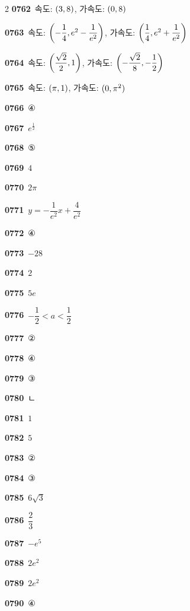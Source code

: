 \documentclass[10pt,a4paper]{article}
\begin{document}
\begin{multicols}{2}
\noindent\textbf{0762}\ 속도: $(3{,}\mkern3mu\mathopen{}8)$, 가속도: $(0{,}\mkern3mu\mathopen{}8)$\par
\noindent\textbf{0763}\ 속도: $\left(-\dfrac{1}{4}{,}\mkern3mu\mathopen{}e^2-\dfrac{1}{e^2}\right)$, 가속도: $\left(\dfrac{1}{4}{,}\mkern3mu\mathopen{}e^2+\dfrac{1}{e^2}\right)$\par
\noindent\textbf{0764}\ 속도: $\left(\dfrac{\sqrt{2}}{2}{,}\mkern3mu\mathopen{}1\right)$, 가속도: $\left(-\dfrac{\sqrt{2}}{8}{,}\mkern3mu\mathopen{}-\dfrac{1}{2}\right)$\par
\noindent\textbf{0765}\ 속도: $(\pi{,}\mkern3mu\mathopen{}1)$, 가속도: $(0{,}\mkern3mu\mathopen{}\pi^2)$\par
\noindent\textbf{0766}\ ④\par
\noindent\textbf{0767}\ $e^{\frac{1}{2}}$\par
\noindent\textbf{0768}\ ⑤\par
\noindent\textbf{0769}\ $4$\par
\noindent\textbf{0770}\ $2\pi$\par
\noindent\textbf{0771}\ $y=-\dfrac{1}{e^2}x+\dfrac{4}{e^2}$\par
\noindent\textbf{0772}\ ④\par
\noindent\textbf{0773}\ $-28$\par
\noindent\textbf{0774}\ $2$\par
\noindent\textbf{0775}\ $5e$\par
\noindent\textbf{0776}\ $-\dfrac{1}{2}<a<\dfrac{1}{2}$\par
\noindent\textbf{0777}\ ②\par
\noindent\textbf{0778}\ ④\par
\noindent\textbf{0779}\ ③\par
\noindent\textbf{0780}\ ㄴ\par
\noindent\textbf{0781}\ $1$\par
\noindent\textbf{0782}\ $5$\par
\noindent\textbf{0783}\ ②\par
\noindent\textbf{0784}\ ③\par
\noindent\textbf{0785}\ $6\sqrt{3}$\par
\noindent\textbf{0786}\ $\dfrac{2}{3}$\par
\noindent\textbf{0787}\ $-e^5$\par
\noindent\textbf{0788}\ $2e^2$\par
\noindent\textbf{0789}\ $2e^2$\par
\noindent\textbf{0790}\ ④\par

\end{multicols}
\end{document}
